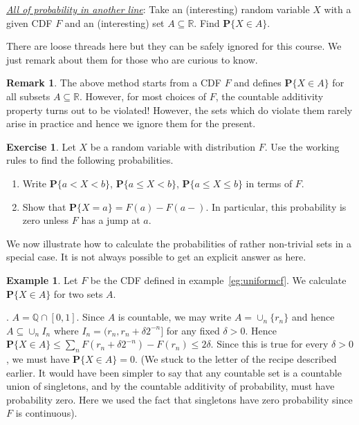\documentclass[preprint,  11pt]{amsart}
\newcommand{\parag}[1]{\vspace{4mm}\noindent{\bfseries #1}}
\theoremstyle{plain} %
\theoremstyle{definition} %
\newtheorem{exercise}[theorem]{Exercise}
\newtheorem{remark}[theorem]{Remark}
\newtheorem{example}[theorem]{Example}
\begin{document}
{{\em\underline{ All of probability in another line}}: Take an (interesting) random variable $X$ with a given CDF $F$ and an (interesting) set $A\subseteq \mathbb{R}$. Find $\mathbf{P}\{X\in A\}$. 


\medskip
There are loose threads here but they can be safely ignored for  this course. We just remark about them for those who are curious to know.

\begin{remark} The above method starts from a CDF $F$ and defines $\mathbf{P}\{X\in A\}$ for all subsets $A\subseteq \mathbb{R}$. However, for most choices of $F$,  the countable additivity property turns out to be  violated! However, the sets which do violate them rarely arise in practice and hence we ignore them for the present.
\end{remark}
 
 \begin{exercise} Let $X$ be  a random variable with distribution $F$. Use the working rules to find the following probabilities.
 \begin{enumerate}\setlength\itemsep{6pt}
 \item Write $\mathbf{P}\{a<X<b\}$, $\mathbf{P}\{a\le X<b\}$, $\mathbf{P}\{a\le X\le b\}$ in terms of $F$.
 \item Show that $\mathbf{P}\{X=a\}=F(a)-F(a-)$. In particular, this probability is zero unless $F$ has a jump at $a$.
 \end{enumerate}
 \end{exercise}
 
 We now illustrate how to calculate the probabilities of rather non-trivial sets in a special case. It is not always possible to get an explicit answer as here.
\begin{example} Let $F$ be the CDF defined in example~\ref{eg:uniformcf}. We calculate $\mathbf{P}\{X\in A\}$ for two sets $A$.

\parag{1}. $A=\mathbb{Q}\cap [0,1]$.  Since $A$ is countable, we may write $A=\cup_{n}\{r_{n}\}$ and hence $A\subseteq \cup_{n}I_{n}$ where $I_{n}=(r_{n},r_{n}+\delta2^{-n}]$ for any fixed $\delta>0$. Hence $\mathbf{P}\{X\in A\}\le \sum_{n}F(r_{n}+\delta 2^{-n})-F(r_{n}) \le 2\delta$. Since this is true for every $\delta>0$, we must have $\mathbf{P}\{X\in A\}=0$. (We stuck to the letter of the recipe described earlier. It would have been simpler to say that any countable set is a countable union of singletons, and by the countable additivity of probability, must have probability zero. Here we used the fact that singletons have zero probability since $F$ is continuous).
\end{example}

}
\end{document}
